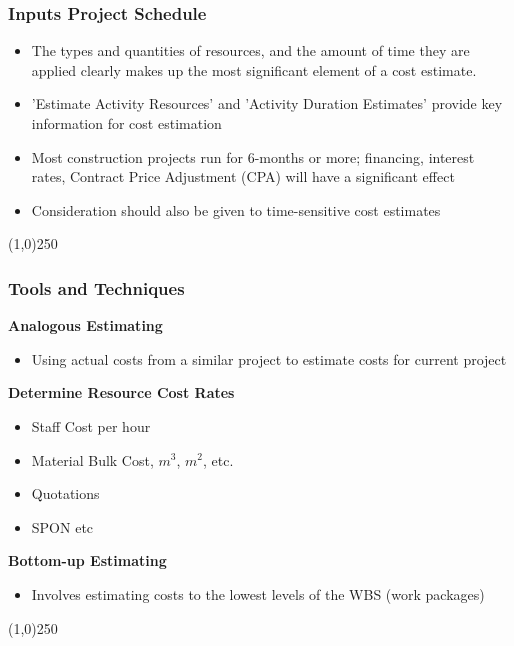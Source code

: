 \begin{frame}
\frametitle{Inputs \hfill\hfill Project Schedule}
\begin{itemize}
	\item The types and quantities of resources, and the amount of time they are applied clearly makes up the most significant element of a cost estimate.
	\item 'Estimate Activity Resources' and 'Activity Duration Estimates' provide key information for cost estimation
	\item Most construction projects run for 6-months or more; financing, interest rates, Contract Price Adjustment (CPA) will have a significant effect
	\item Consideration should also be given to time-sensitive cost estimates  
\end{itemize}
\end{frame}
\begin{center}\line(1,0){250}\end{center}






\begin{frame}
\frametitle{Tools and Techniques}
\textbf{Analogous Estimating}
\begin{itemize}
	\item Using actual costs from a similar project to estimate costs for current project
\end{itemize}
\textbf{Determine Resource Cost Rates}
\begin{itemize}
	\item Staff Cost per hour
	\item Material Bulk Cost, $m^{3}$, $m^{2}$, etc.
	\item Quotations
	\item SPON etc
\end{itemize}
\textbf{Bottom-up Estimating}
\begin{itemize}
	\item Involves estimating costs to the lowest levels of the WBS (work packages)
\end{itemize}
\end{frame}
\begin{center}\line(1,0){250}\end{center}






